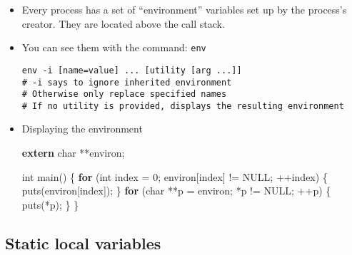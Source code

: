 \documentclass[]{article}
\newenvironment{Shaded}{}{}
\newcommand{\KeywordTok}[1]{\textcolor[rgb]{0.00,0.44,0.13}{\textbf{#1}}}
\newcommand{\DataTypeTok}[1]{\textcolor[rgb]{0.56,0.13,0.00}{#1}}
\newcommand{\DecValTok}[1]{\textcolor[rgb]{0.25,0.63,0.44}{#1}}
\newcommand{\ControlFlowTok}[1]{\textcolor[rgb]{0.00,0.44,0.13}{\textbf{#1}}}
\newcommand{\NormalTok}[1]{#1}
\begin{document}
\begin{itemize}
\item
  Every process has a set of ``environment'' variables set up by the
  process's creator. They are located above the call stack.
\item
  You can see them with the command: \texttt{env}

\begin{verbatim}
env -i [name=value] ... [utility [arg ...]]
# -i says to ignore inherited environment
# Otherwise only replace specified names
# If no utility is provided, displays the resulting environment
\end{verbatim}
\item
  Displaying the environment

\begin{Shaded}
\begin{Highlighting}[]
\KeywordTok{extern} \DataTypeTok{char}\NormalTok{ **environ;}

\DataTypeTok{int}\NormalTok{ main() \{}
    \ControlFlowTok{for}\NormalTok{ (}\DataTypeTok{int}\NormalTok{ index = }\DecValTok{0}\NormalTok{; environ[index] != NULL; ++index) \{}
\NormalTok{    	puts(environ[index]);}
\NormalTok{    \}}
    \ControlFlowTok{for}\NormalTok{ (}\DataTypeTok{char}\NormalTok{ **p = environ; *p != NULL; ++p) \{}
\NormalTok{        puts(*p);}
\NormalTok{    \}}
\NormalTok{\}}
\end{Highlighting}
\end{Shaded}
\end{itemize}

\subsection{\texorpdfstring{\textbf{Static local
variables}}{Static local variables}}\label{header-n79}
\end{document}
